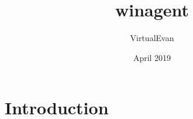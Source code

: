 \documentclass{article}
\title{winagent}
\author{VirtualEvan }
\date{April 2019}
\begin{document}
\maketitle

\section{Introduction}
\end{document}
